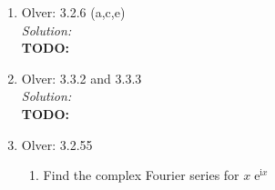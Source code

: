 \documentclass[10pt]{amsart}
\newcommand{\I}{\mathrm{i}}
\DeclareMathOperator{\E}{e}
\theoremstyle{nonumberplain}
\begin{document}
\begin{enumerate}[label={\bf {\arabic*}:}]
\item Olver: 3.2.6 (a,c,e) \\

\noindent
\textit{Solution:} \\
\textbf{TODO:}

\newpage


\item Olver: 3.3.2 and 3.3.3 \\

\noindent
\textit{Solution:} \\
\textbf{TODO:}

\newpage


\item Olver: 3.2.55 \\
\begin{enumerate}
\item Find the complex Fourier series for $x\E^{\I x}$ \\


\end{enumerate}
\end{enumerate}
\end{document}
